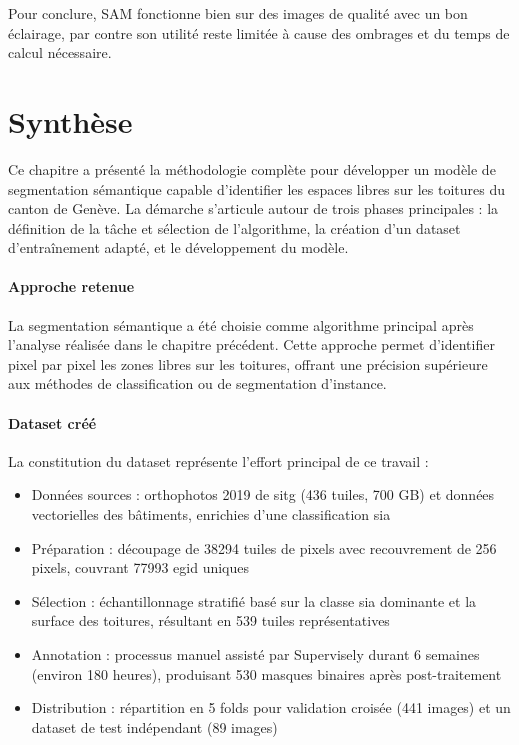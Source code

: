 Pour conclure, SAM fonctionne bien sur des images de qualité avec un bon éclairage, par contre son utilité reste limitée à cause des ombrages et du temps de calcul nécessaire.

\section{Synthèse}

Ce chapitre a présenté la méthodologie complète pour développer un modèle de segmentation sémantique capable d'identifier les espaces libres sur les toitures du canton de Genève. La démarche s'articule autour de trois phases principales : la définition de la tâche et sélection de l'algorithme, la création d'un dataset d'entraînement adapté, et le développement du modèle.

\paragraph{Approche retenue}
La segmentation sémantique a été choisie comme algorithme principal après l'analyse réalisée dans le chapitre précédent. Cette approche permet d'identifier pixel par pixel les zones libres sur les toitures, offrant une précision supérieure aux méthodes de classification ou de segmentation d'instance.

\paragraph{Dataset créé}
La constitution du dataset représente l'effort principal de ce travail :
\begin{itemize}
    \item Données sources : orthophotos 2019 de \acrshort{sitg} (436 tuiles, 700 GB) et données vectorielles des bâtiments, enrichies d'une classification \gls{sia}
    \item Préparation : découpage de 38294 tuiles de \si{} pixels avec recouvrement de 256 pixels, couvrant 77993 \gls{egid} uniques
    \item Sélection : échantillonnage stratifié basé sur la classe \gls{sia} dominante et la surface des toitures, résultant en 539 tuiles représentatives
    \item Annotation : processus manuel assisté par Supervisely durant 6 semaines (environ 180 heures), produisant 530 masques binaires après post-traitement
    \item Distribution : répartition en 5 folds pour validation croisée (441 images) et un dataset de test indépendant (89 images)
\end{itemize}

